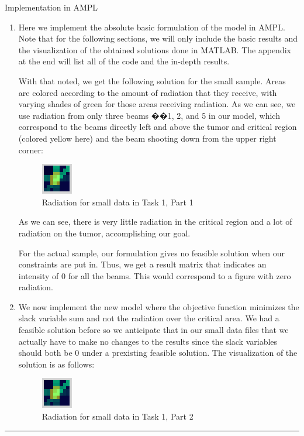 \documentclass[12pt]{article}
\makeatletter
\newenvironment{task}{\@startsection
       {section}{1}
       {0.4em}{-.5ex plus -1ex minus -.2ex}{.5ex plus .2ex}
       {\pagebreak[3]\large\bf\noindent{Task}}}
       {\nopagebreak[3]\vspace{3ex}\begin{center}\rule{1\linewidth}{.3pt}\end{center}}
\makeatother
\begin{document}
\begin{task}{Implementation in AMPL}
\begin{enumerate}
\item Here we implement the absolute basic formulation of the model in AMPL. Note that for the following sections, we will only include the basic results and the visualization of the obtained solutions done in MATLAB. The appendix at the end will list all of the code and the in-depth results. 

With that noted, we get the following solution for the small sample. Areas are colored according to the amount of radiation that they receive, with varying shades of green for those areas receiving radiation. As we can see, we use radiation from only three beams ��1, 2, and 5 in our model, which correspond to the beams directly left and above the tumor and critical region (colored yellow here) and the beam shooting down from the upper right corner: 

\begin{figure} [H]
	\centering
	\includegraphics[scale = 3.0] {visualization1_small.png} 
	\caption{Radiation for small data in Task 1, Part 1}
\end{figure}

As we can see, there is very little radiation in the critical region and a lot of radiation on the tumor, accomplishing our goal.

For the actual sample, our formulation gives no feasible solution when our constraints are put in. Thus, we get a result matrix that indicates an intensity of 0 for all the beams. This would correspond to a figure with zero radiation. 

\item We now implement the new model where the objective function minimizes the slack variable sum and not the radiation over the critical area. We had a feasible solution before so we anticipate that in our small data files that we actually have to make no changes to the results since the slack variables should both be 0 under a prexisting feasible solution. The visualization of the solution is as follows:

\begin{figure} [H]
	\centering
	\includegraphics[scale = 3.0] {visualization1_small.png} 
	\caption{Radiation for small data in Task 1, Part 2}
\end{figure}


\end{enumerate}
\end{task}
\end{document}
